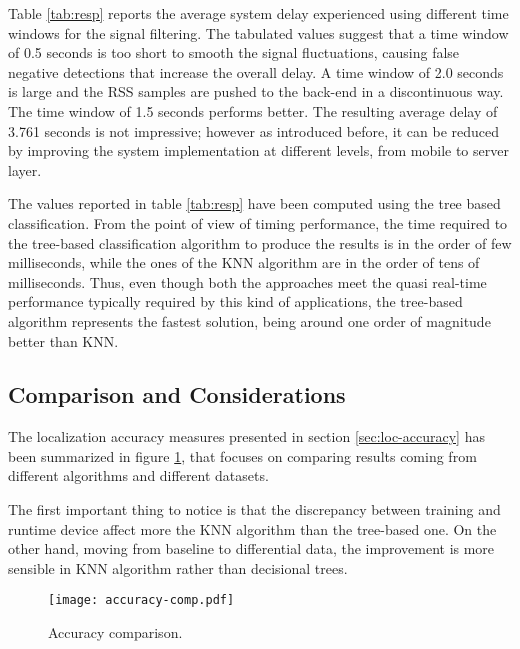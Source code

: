 Table \ref{tab:resp} reports the average system delay experienced using different time windows for the signal filtering. The tabulated values suggest that a time window of 0.5 seconds is too short to smooth the signal fluctuations, causing false negative detections that increase the overall delay. A time window of 2.0 seconds is large and the RSS samples are pushed to the back-end in a discontinuous way. The time window of 1.5 seconds performs better. The resulting average delay of 3.761 seconds is not impressive; however as introduced before, it can be reduced by improving the system implementation at different levels, from mobile to server layer.

The values reported in table \ref{tab:resp} have been computed using the tree based classification.
From the point of view of timing performance, the time required to the tree-based classification algorithm to produce the results is in the order of few milliseconds, while the ones of the KNN algorithm are in the order of tens of milliseconds. Thus, even though both the approaches meet the quasi real-time performance typically required by this kind of applications, the tree-based algorithm represents the fastest solution, being around one order of magnitude better than KNN.

\subsection{Comparison and Considerations}
\label{sec:accuracy-comp}
The localization accuracy measures presented in section \ref{sec:loc-accuracy} has been summarized in figure \ref{fig:accuracy-comp}, that focuses on comparing results coming from different algorithms and different datasets.

The first important thing to notice is that the discrepancy between training and runtime device affect more the KNN algorithm than the tree-based one. On the other hand, moving from baseline to differential data, the improvement is more sensible in KNN algorithm rather than decisional trees.


\begin{figure}[h!tb]
\centering\texttt{[image: accuracy-comp.pdf]}
\caption{Accuracy comparison.}
\label{fig:accuracy-comp}
\end{figure}

